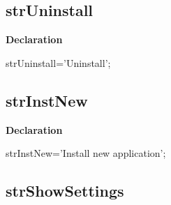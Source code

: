 \documentclass{report}
\newif\ifpdf
\begin{document}
\subsection*{strUninstall}
\fi
\label{trstrings-strUninstall}
\begin{list}{}{
\setlength{\itemindent}{0cm}
\setlength{\listparindent}{0cm}
\setlength{\leftmargin}{\evensidemargin}
\addtolength{\leftmargin}{\tmplength}
\settowidth{\labelsep}{X}
\addtolength{\leftmargin}{\labelsep}
\setlength{\labelwidth}{\tmplength}
}
\item[\textbf{Declaration}\hfill]
\ifpdf
\begin{flushleft}
\fi
\begin{ttfamily}
strUninstall='Uninstall';\end{ttfamily}

\ifpdf
\end{flushleft}
\fi

\end{list}
\ifpdf
\subsection*{\large{\textbf{strInstNew}}\normalsize\hspace{1ex}\hrulefill}
\else
\subsection*{strInstNew}
\fi
\label{trstrings-strInstNew}
\begin{list}{}{
\setlength{\itemindent}{0cm}
\setlength{\listparindent}{0cm}
\setlength{\leftmargin}{\evensidemargin}
\addtolength{\leftmargin}{\tmplength}
\settowidth{\labelsep}{X}
\addtolength{\leftmargin}{\labelsep}
\setlength{\labelwidth}{\tmplength}
}
\item[\textbf{Declaration}\hfill]
\ifpdf
\begin{flushleft}
\fi
\begin{ttfamily}
strInstNew='Install new application';\end{ttfamily}

\ifpdf
\end{flushleft}
\fi

\end{list}
\ifpdf
\subsection*{\large{\textbf{strShowSettings}}\normalsize\hspace{1ex}\hrulefill}
\else
\end{document}
